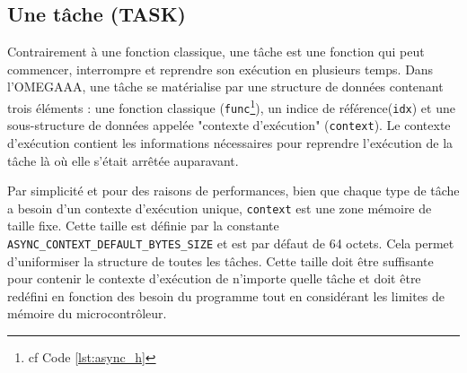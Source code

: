 \subsection{Une tâche (TASK)}
\label{subsec:task}

Contrairement à une fonction classique, une tâche est une fonction qui peut commencer,
interrompre et reprendre son exécution en plusieurs temps. Dans l'OMEGAAA, une tâche se
matérialise par une structure de données contenant trois éléments : une fonction classique
(\texttt{func}\footnote{\label{footnote:ref_async_h}cf Code \ref{lst:async_h}}), un indice
de référence(\texttt{idx}) et une sous-structure de données
appelée "contexte d'exécution" (\texttt{context}).
Le contexte d'exécution contient les informations nécessaires pour reprendre l'exécution de
la tâche là où elle s'était arrêtée auparavant.

Par simplicité et pour des raisons de performances, bien que chaque type de tâche a besoin
d'un contexte d'exécution unique, \texttt{context} est une zone mémoire de taille fixe.
Cette taille est définie par la constante \texttt{ASYNC\_CONTEXT\_DEFAULT\_BYTES\_SIZE}
 et est par défaut de 64 octets. Cela permet d'uniformiser
la structure de toutes les tâches. Cette taille doit être suffisante pour contenir le contexte
d'exécution de n'importe quelle tâche et doit être redéfini en fonction des besoin du programme
tout en considérant les limites de mémoire du microcontrôleur.
